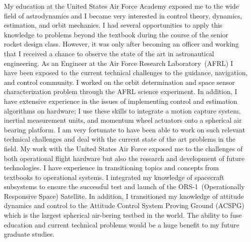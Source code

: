 \documentclass[12pt, oneside]{article}   	%
\begin{document}


My education at the United States Air Force Academy exposed me to the wide field of astrodynamics and I became very interested in control theory, dynamics, estimation, and orbit mechanics.
I had several opportunities to apply this knowledge to problems beyond the textbook during the course of the senior rocket design class.
However, it was only after becoming an officer and working that I received a chance to observe the state of the art in astronautical engineering.
As an Engineer at the Air Force Research Laboratory~(AFRL) I have been exposed to the current technical challenges to the guidance, navigation, and control community.
I worked on the orbit determination and space sensor characterization problem through the AFRL science experiment.
In addition, I have extensive experience in the issues of implementing control and estimation algorithms on hardware; I use these skills to integrate a motion capture system, inertial measurement units, and momentum wheel actuators onto a spherical air bearing platform.
I am very fortunate to have been able to work on such relevant technical challenges and deal with the current state of the art problems in the field. 
My work with the United States Air Force exposed me to the challenges of both operational flight hardware but also the research and development of future technologies.
I have experience in transitioning topics and concepts from textbooks to operational systems. 
I integrated my knowledge of spacecraft subsystems to ensure the successful test and launch of the ORS-1~(Operationally Responsive Space) Satellite.
In addition, I transitioned my knowledge of attitude dynamics and control to the Attitude Control System Proving Ground (ACSPG) which is the largest spherical air-bering testbed in the world. 
The ability to fuse education and current technical problems would be a huge benefit to my future graduate studies.
\end{document}
